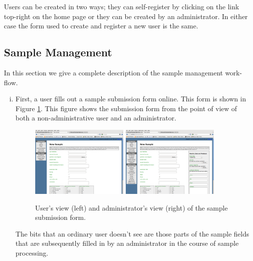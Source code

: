 \documentclass[12pt,twoside]{article}
\begin{document}
Users can be created in two ways; they can self-register by clicking
on the link top-right on the home page or they can be created by an
administrator. In either case the form used to create and register a new
user is the same.

\subsection{Sample Management}

In this section we give a complete description of the sample management
work-flow.
\begin{enumerate}[(i)]
\item
First, a user fills out a sample submission form online. This form is
shown in Figure \ref{fig:sampleform}. This figure shows the
submission form from the point of view of both a non-administrative user
and an administrator.
\begin{figure}[!htb]
\begin{center}
\includegraphics[width=0.45\textwidth]{sampleformuser}
\quad
\includegraphics[width=0.45\textwidth]{sampleformadmin}
\caption{User's view (left) and administrator's view (right)
of the sample submission form.\label{fig:sampleform}}
\end{center}
\end{figure}

The bits that an ordinary user doesn't see are those parts of the sample
fields that are subsequently filled in by an administrator in the course
of sample processing.


\end{enumerate}
\end{document}
